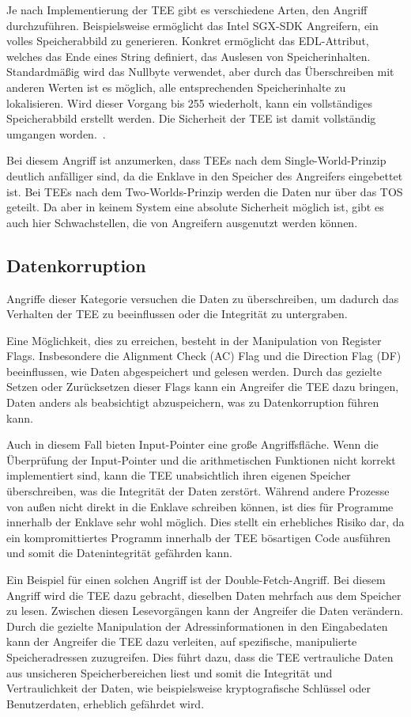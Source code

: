 Je nach Implementierung der TEE gibt es verschiedene Arten, den Angriff durchzuführen. Beispielsweise ermöglicht das Intel SGX-SDK Angreifern, ein volles Speicherabbild zu generieren. Konkret ermöglicht das EDL-Attribut, welches das Ende eines String definiert, das Auslesen von Speicherinhalten. Standardmäßig wird das Nullbyte verwendet, aber durch das Überschreiben mit anderen Werten ist es möglich, alle entsprechenden Speicherinhalte zu lokalisieren. Wird dieser Vorgang bis 255 wiederholt, kann ein vollständiges Speicherabbild erstellt werden. Die Sicherheit der TEE ist damit vollständig umgangen worden.~\cite{IntelSGX, TEEPaper}.

Bei diesem Angriff ist anzumerken, dass TEEs nach dem Single-World-Prinzip deutlich anfälliger sind, da die Enklave in den Speicher des Angreifers eingebettet ist. Bei TEEs nach dem Two-Worlds-Prinzip werden die Daten nur über das TOS geteilt. Da aber in keinem System eine absolute Sicherheit möglich ist, gibt es auch hier Schwachstellen, die von Angreifern ausgenutzt werden können.

\subsection{Datenkorruption}
Angriffe dieser Kategorie versuchen die Daten zu überschreiben, um dadurch das Verhalten der TEE zu beeinflussen oder die Integrität zu untergraben.

Eine Möglichkeit, dies zu erreichen, besteht in der Manipulation von Register Flags. Insbesondere die Alignment Check (AC) Flag und die Direction Flag (DF) beeinflussen, wie Daten abgespeichert und gelesen werden. Durch das gezielte Setzen oder Zurücksetzen dieser Flags kann ein Angreifer die TEE dazu bringen, Daten anders als beabsichtigt abzuspeichern, was zu Datenkorruption führen kann.

Auch in diesem Fall bieten Input-Pointer eine große Angriffsfläche. Wenn die Überprüfung der Input-Pointer und die arithmetischen Funktionen nicht korrekt implementiert sind, kann die TEE unabsichtlich ihren eigenen Speicher überschreiben, was die Integrität der Daten zerstört. Während andere Prozesse von außen nicht direkt in die Enklave schreiben können, ist dies für  Programme innerhalb der Enklave sehr wohl möglich. Dies stellt ein erhebliches Risiko dar, da ein kompromittiertes Programm innerhalb der TEE bösartigen Code ausführen und somit die Datenintegrität gefährden kann.


Ein Beispiel für einen solchen Angriff ist der Double-Fetch-Angriff. Bei diesem Angriff wird die TEE dazu gebracht, dieselben Daten mehrfach aus dem Speicher zu lesen. Zwischen diesen Lesevorgängen kann der Angreifer die Daten verändern. Durch die gezielte Manipulation der Adressinformationen in den Eingabedaten kann der Angreifer die TEE dazu verleiten, auf spezifische, manipulierte Speicheradressen zuzugreifen. Dies führt dazu, dass die TEE vertrauliche Daten aus unsicheren Speicherbereichen liest und somit die Integrität und Vertraulichkeit der Daten, wie beispielsweise kryptografische Schlüssel oder Benutzerdaten, erheblich gefährdet wird.

